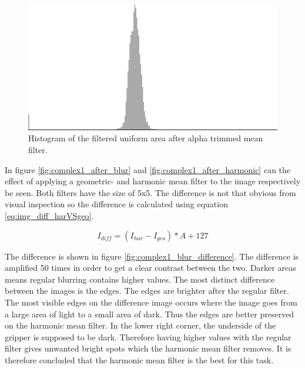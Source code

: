 \begin{figure}[H]
\centering
\includegraphics[width = \histogramWidth]{graphics/hist1_uniform2.png}
\caption{Histogram of the filtered uniform area after alpha trimmed mean filter.}
\label{fig:hist_img1_after_alpha}
\end{figure}

In figure \ref{fig:complex1_after_blur} and \ref{fig:complex1_after_harmonic} can the effect of applying a geometric- and harmonic mean filter to the image respectively be seen.
Both filters have the size of 5x5. 
The difference is not that obvious from visual inspection so the difference is calculated using equation \ref{eq:img_diff_harVSgeo}.

\begin{equation}
I_{diff} = \left( I_{har} - I_{geo} \right) * A + 127
\label{eq:img_diff_harVSgeo}
\end{equation}

The difference is shown in figure \ref{fig:complex1_blur_difference}.
The difference is amplified 50 times in order to get a clear contrast between the two.
Darker areas means regular blurring contains higher values.
The most distinct difference between the images is the edges. 
The edges are brighter after the regular filter. 
The most visible edges on the difference image occurs where the image goes from a large area of light to a small area of dark.
Thus the edges are better preserved on the harmonic mean filter.
In the lower right corner, the underside of the gripper is supposed to be dark.
Therefore having higher values with the regular filter gives unwanted bright spots which the harmonic mean filter removes.
It is therefore concluded that the harmonic mean filter is the best for this task.

